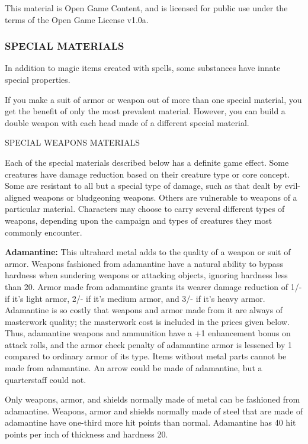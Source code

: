 \documentclass{article}
\begin{document}
This material is Open Game Content, and is licensed for public use under the terms 
of the Open Game License v1.0a.

\subsubsection*{{\LARGE{}SPECIAL MATERIALS}}

In addition to magic items created with spells, some substances have innate special 
properties.

If you make a suit of armor or weapon out of more than one special material, you 
get the benefit of only the most prevalent material. However, you can build a double 
weapon with each head made of a different special material. 

\vspace{12pt}
SPECIAL WEAPONS MATERIALS

Each of the special materials described below has a definite game effect. Some 
creatures have damage reduction based on their creature type or core concept. Some 
are resistant to all but a special type of damage, such as that dealt by evil-aligned 
weapons or bludgeoning weapons. Others are vulnerable to weapons of a particular 
material. Characters may choose to carry several different types of weapons, depending 
upon the campaign and types of creatures they most commonly encounter. 

\vspace{12pt}
\textbf{Adamantine:} This ultrahard metal adds to the quality of a weapon or suit 
of armor. Weapons fashioned from adamantine have a natural ability to bypass hardness 
when sundering weapons or attacking objects, ignoring hardness less than 20. Armor 
made from adamantine grants its wearer damage reduction of 1/- if it's light armor, 
2/- if it's medium armor, and 3/- if it's heavy armor. Adamantine is so costly 
that weapons and armor made from it are always of masterwork quality; the masterwork 
cost is included in the prices given below. Thus, adamantine weapons and ammunition 
have a +1 enhancement bonus on attack rolls, and the armor check penalty of adamantine 
armor is lessened by 1 compared to ordinary armor of its type. Items without metal 
parts cannot be made from adamantine. An arrow could be made of adamantine, but 
a quarterstaff could not.

Only weapons, armor, and shields normally made of metal can be fashioned from adamantine. 
Weapons, armor and shields normally made of steel that are made of adamantine have 
one-third more hit points than normal. Adamantine has 40 hit points per inch of 
thickness and hardness 20.
\end{document}

